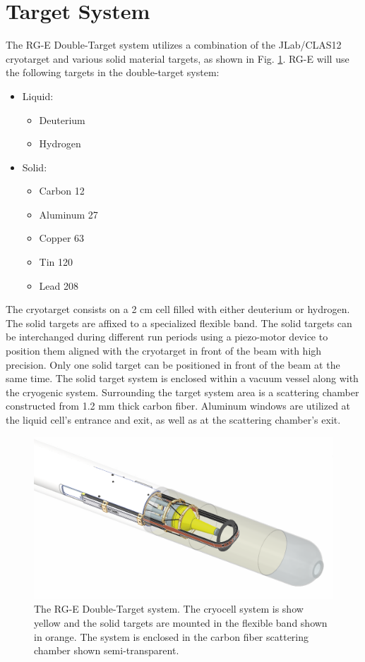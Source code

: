 \section{Target System}
The RG-E Double-Target system utilizes a combination of the JLab/CLAS12
cryotarget and various solid material targets, as shown in Fig. \ref{fig:rge-target}. RG-E will use the following targets in the double-target system:
\begin{itemize}
    \item Liquid:
    \begin{itemize}
        \item Deuterium
        \item Hydrogen
    \end{itemize}
    \item Solid:
    \begin{itemize}
        \item Carbon 12
        \item Aluminum 27
        \item Copper 63
        \item Tin 120
        \item Lead 208
    \end{itemize}
\end{itemize}

  The cryotarget consists on a 2 cm cell filled with either deuterium or hydrogen. The solid targets are affixed to a specialized flexible band. The solid targets can be interchanged during different run periods using a piezo-motor device to position them aligned with the cryotarget in front of the beam with high precision. Only one solid target can be positioned in front of the beam at the same time.
  The solid target system is enclosed within a vacuum vessel along with the cryogenic system. Surrounding the target system area is a scattering chamber constructed from 1.2 mm thick carbon fiber. Aluminum windows are utilized at the liquid cell's entrance and exit, as well as at the scattering chamber's exit.
  \begin{figure}
      \centering
      \includegraphics[width=0.9\columnwidth]{pics/rge-target.png}
      \caption{The RG-E Double-Target system. The cryocell system is show yellow and the solid targets are mounted in the flexible band shown in orange. The system is enclosed in the carbon fiber scattering chamber shown semi-transparent.}
      \label{fig:rge-target}
  \end{figure}

